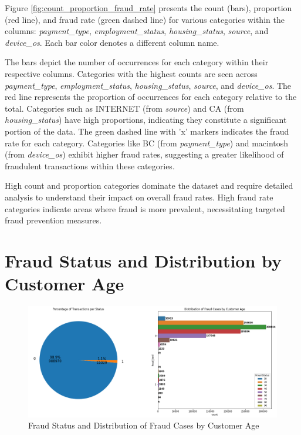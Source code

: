 \documentclass[12pt,a4paper]{report}
\begin{document}
Figure \ref{fig:count_proportion_fraud_rate} presents the count (bars), proportion (red line), and fraud rate (green dashed line) for various categories within the columns: \textit{payment\_type}, \textit{employment\_status}, \textit{housing\_status}, \textit{source}, and \textit{device\_os}. Each bar color denotes a different column name.

The bars depict the number of occurrences for each category within their respective columns. Categories with the highest counts are seen across \textit{payment\_type}, \textit{employment\_status}, \textit{housing\_status}, \textit{source}, and \textit{device\_os}. The red line represents the proportion of occurrences for each category relative to the total. Categories such as INTERNET (from \textit{source}) and CA (from \textit{housing\_status}) have high proportions, indicating they constitute a significant portion of the data. The green dashed line with 'x' markers indicates the fraud rate for each category. Categories like BC (from \textit{payment\_type}) and macintosh (from \textit{device\_os}) exhibit higher fraud rates, suggesting a greater likelihood of fraudulent transactions within these categories.

High count and proportion categories dominate the dataset and require detailed analysis to understand their impact on overall fraud rates. High fraud rate categories indicate areas where fraud is more prevalent, necessitating targeted fraud prevention measures.

\section{Fraud Status and Distribution by Customer Age}

\begin{figure}[h]
    \centering
    \includegraphics[width=\textwidth]{Distribution_of_Fraud_Cases.png}
    \caption{Fraud Status and Distribution of Fraud Cases by Customer Age}
    \label{fig:fraud_status_distribution_age}
\end{figure}
\end{document}
